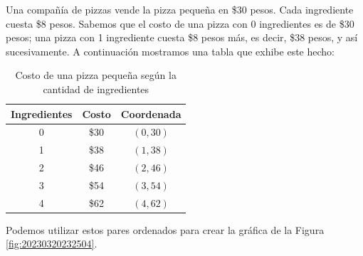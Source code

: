 \begin{minipage}[t][][b]{0.8\textwidth}
    Una compañía de pizzas vende la pizza pequeña en \$30 pesos. Cada ingrediente cuesta \$8 pesos.
    Sabemos que el costo de una pizza con 0 ingredientes es de \$30 pesos; una pizza con 1 ingrediente cuesta \$8 pesos más,
    es decir, \$38 pesos, y así sucesivamente. A continuación mostramos una tabla que exhibe este hecho:

    \begin{table}[H]
        \centering
        \caption{Costo de una pizza pequeña según la cantidad de ingredientes}
        \label{tab:pizza_ingredientes}
        \begin{tabular}{|c|c|c|}
            \toprule
            \rowcolor{colorrds!80}
            \textbf{\color{white}Ingredientes} & \textbf{\color{white}Costo} & \textbf{\color{white}Coordenada} \\\midrule
            0                                  & \$30                        & $(0,30)$                         \\\hline
            1                                  & \$38                        & $(1,38)$                         \\\hline
            2                                  & \$46                        & $(2,46)$                         \\\hline
            3                                  & \$54                        & $(3,54)$                         \\\hline
            4                                  & \$62                        & $(4,62)$                         \\\hline
            \bottomrule
        \end{tabular}
    \end{table}
    Podemos utilizar estos pares ordenados para crear la gráfica de la Figura \ref{fig:20230320232504}.
\end{minipage}\hfill
